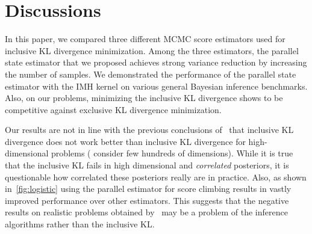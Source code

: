 
\section{Discussions}\label{section:discussion}
In this paper, we compared three different MCMC score estimators used for inclusive KL divergence minimization.
Among the three estimators, the parallel state estimator that we proposed achieves strong variance reduction by increasing the number of samples.
We demonstrated the performance of the parallel state estimator with the IMH kernel on various general Bayesian inference benchmarks.
Also, on our problems, minimizing the inclusive KL divergence shows to be competitive against exclusive KL divergence minimization.

Our results are not in line with the previous conclusions of~\citet{dhaka_challenges_2021} that inclusive KL divergence does not work better than inclusive KL divergence for high-dimensional problems (\citeauthor{dhaka_challenges_2021} consider few hundreds of dimensions).
While it is true that the inclusive KL fails in high dimensional and \textit{correlated} posteriors, it is questionable how correlated these posteriors really are in practice.
Also, as shown in~\cref{fig:logistic} using the parallel estimator for score climbing results in vastly improved performance over other estimators.
This suggests that the negative results on realistic problems obtained by~\citet{dhaka_challenges_2021} may be a problem of the inference algorithms rather than the inclusive KL.


